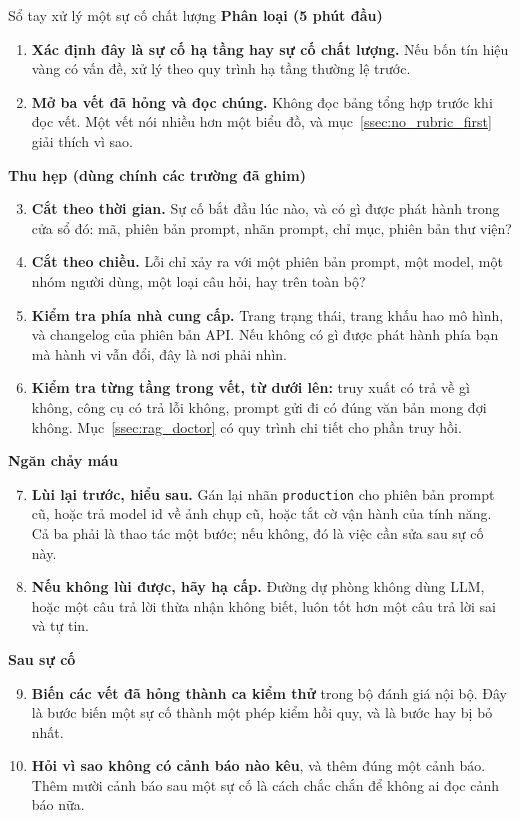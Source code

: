 \begin{checklist}{Sổ tay xử lý một sự cố chất lượng}
\textbf{Phân loại (5 phút đầu)}
\begin{enumerate}
	\item \textbf{Xác định đây là sự cố hạ tầng hay sự cố chất lượng.} Nếu bốn tín hiệu vàng có vấn đề, xử lý theo quy trình hạ tầng thường lệ trước.
	\item \textbf{Mở ba vết đã hỏng và đọc chúng.} Không đọc bảng tổng hợp trước khi đọc vết. Một vết nói nhiều hơn một biểu đồ, và mục~\ref{ssec:no_rubric_first} giải thích vì sao.
\end{enumerate}

\textbf{Thu hẹp (dùng chính các trường đã ghim)}
\begin{enumerate}\setcounter{enumi}{2}
	\item \textbf{Cắt theo thời gian.} Sự cố bắt đầu lúc nào, và có gì được phát hành trong cửa sổ đó: mã, phiên bản prompt, nhãn prompt, chỉ mục, phiên bản thư viện?
	\item \textbf{Cắt theo chiều.} Lỗi chỉ xảy ra với một phiên bản prompt, một model, một nhóm người dùng, một loại câu hỏi, hay trên toàn bộ?
	\item \textbf{Kiểm tra phía nhà cung cấp.} Trang trạng thái, trang khấu hao mô hình, và changelog của phiên bản API. Nếu không có gì được phát hành phía bạn mà hành vi vẫn đổi, đây là nơi phải nhìn.
	\item \textbf{Kiểm tra từng tầng trong vết, từ dưới lên:} truy xuất có trả về gì không, công cụ có trả lỗi không, prompt gửi đi có đúng văn bản mong đợi không. Mục~\ref{ssec:rag_doctor} có quy trình chi tiết cho phần truy hồi.
\end{enumerate}

\textbf{Ngăn chảy máu}
\begin{enumerate}\setcounter{enumi}{6}
	\item \textbf{Lùi lại trước, hiểu sau.} Gán lại nhãn \texttt{production} cho phiên bản prompt cũ, hoặc trả model id về ảnh chụp cũ, hoặc tắt cờ vận hành của tính năng. Cả ba phải là thao tác một bước; nếu không, đó là việc cần sửa sau sự cố này.
	\item \textbf{Nếu không lùi được, hãy hạ cấp.} Đường dự phòng không dùng LLM, hoặc một câu trả lời thừa nhận không biết, luôn tốt hơn một câu trả lời sai và tự tin.
\end{enumerate}

\textbf{Sau sự cố}
\begin{enumerate}\setcounter{enumi}{8}
	\item \textbf{Biến các vết đã hỏng thành ca kiểm thử} trong bộ đánh giá nội bộ. Đây là bước biến một sự cố thành một phép kiểm hồi quy, và là bước hay bị bỏ nhất.
	\item \textbf{Hỏi vì sao không có cảnh báo nào kêu}, và thêm đúng một cảnh báo. Thêm mười cảnh báo sau một sự cố là cách chắc chắn để không ai đọc cảnh báo nữa.
\end{enumerate}
\end{checklist}

